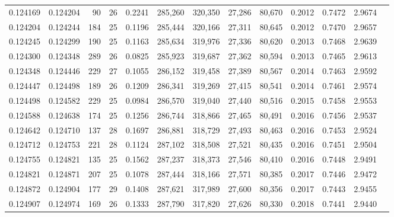 \begin{tabular}{rrrrrrrrrrrrr}
0.124169 & 0.124204 &  90 &  26 &                                     0.2241 & 285,260 & 320,350 &  27,286 &  80,670 & 0.2012 & 0.7472 & 2.9674 \\
0.124204 & 0.124244 & 184 &  25 &                                     0.1196 & 285,444 & 320,166 &  27,311 &  80,645 & 0.2012 & 0.7470 & 2.9657 \\
0.124245 & 0.124299 & 190 &  25 &                                     0.1163 & 285,634 & 319,976 &  27,336 &  80,620 & 0.2013 & 0.7468 & 2.9639 \\
0.124300 & 0.124348 & 289 &  26 &                                     0.0825 & 285,923 & 319,687 &  27,362 &  80,594 & 0.2013 & 0.7465 & 2.9613 \\
0.124348 & 0.124446 & 229 &  27 &                                     0.1055 & 286,152 & 319,458 &  27,389 &  80,567 & 0.2014 & 0.7463 & 2.9592 \\
0.124447 & 0.124498 & 189 &  26 &                                     0.1209 & 286,341 & 319,269 &  27,415 &  80,541 & 0.2014 & 0.7461 & 2.9574 \\
0.124498 & 0.124582 & 229 &  25 &                                     0.0984 & 286,570 & 319,040 &  27,440 &  80,516 & 0.2015 & 0.7458 & 2.9553 \\
0.124588 & 0.124638 & 174 &  25 &                                     0.1256 & 286,744 & 318,866 &  27,465 &  80,491 & 0.2016 & 0.7456 & 2.9537 \\
0.124642 & 0.124710 & 137 &  28 &                                     0.1697 & 286,881 & 318,729 &  27,493 &  80,463 & 0.2016 & 0.7453 & 2.9524 \\
0.124712 & 0.124753 & 221 &  28 &                                     0.1124 & 287,102 & 318,508 &  27,521 &  80,435 & 0.2016 & 0.7451 & 2.9504 \\
0.124755 & 0.124821 & 135 &  25 &                                     0.1562 & 287,237 & 318,373 &  27,546 &  80,410 & 0.2016 & 0.7448 & 2.9491 \\
0.124821 & 0.124871 & 207 &  25 &                                     0.1078 & 287,444 & 318,166 &  27,571 &  80,385 & 0.2017 & 0.7446 & 2.9472 \\
0.124872 & 0.124904 & 177 &  29 &                                     0.1408 & 287,621 & 317,989 &  27,600 &  80,356 & 0.2017 & 0.7443 & 2.9455 \\
0.124907 & 0.124974 & 169 &  26 &                                     0.1333 & 287,790 & 317,820 &  27,626 &  80,330 & 0.2018 & 0.7441 & 2.9440 \\

\end{tabular}
